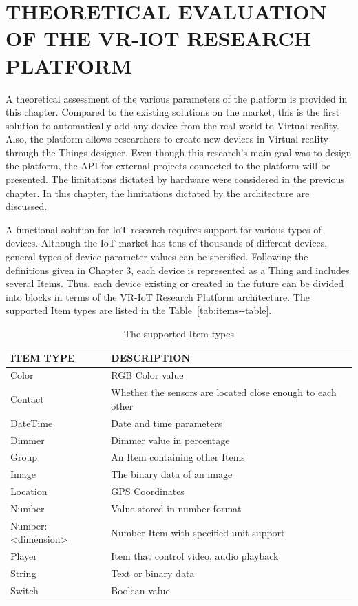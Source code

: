 
\chapter{THEORETICAL EVALUATION OF THE VR-IOT RESEARCH PLATFORM}

A theoretical assessment of the various parameters of the platform is provided in this chapter. Compared to the existing solutions on the market, this is the first solution to automatically add any device from the real world to Virtual reality. Also, the platform allows researchers to create new devices in Virtual reality through the Things designer. Even though this research's main goal was to design the platform, the API for external projects connected to the platform will be presented. The limitations dictated by hardware were considered in the previous chapter. In this chapter, the limitations dictated by the architecture are discussed.

A functional solution for IoT research requires support for various types of devices. Although the IoT market has tens of thousands of different devices, general types of device parameter values ​​can be specified. Following the definitions given in Chapter 3, each device is represented as a Thing and includes several Items. Thus, each device existing or created in the future can be divided into blocks in terms of the VR-IoT Research Platform architecture. The supported Item types are listed in the Table~\ref{tab:items--table}.

\begin{table}
  \centering
  \begin{threeparttable}[c]
    \caption{The supported Item types}
    \label{tab:items-table}
    \begin{tabular}{ll}
      \toprule
      ITEM TYPE    &         DESCRIPTION                 \\
      \midrule
      Color &	RGB Color value \\
      Contact & Whether the sensors are located close enough to each other \\
      DateTime & Date and time parameters \\
      Dimmer &	Dimmer value in percentage \\
      Group &	An Item containing other Items \\
      Image &	The binary data of an image \\
      Location & GPS Coordinates \\
      Number & Value stored in number format \\
      Number:<dimension> & Number Item with specified unit support \\
      Player & Item that control video, audio playback \\
      String &	Text or binary data \\
      Switch & Boolean value \\
      \bottomrule
    \end{tabular}
  \end{threeparttable}
\end{table}

